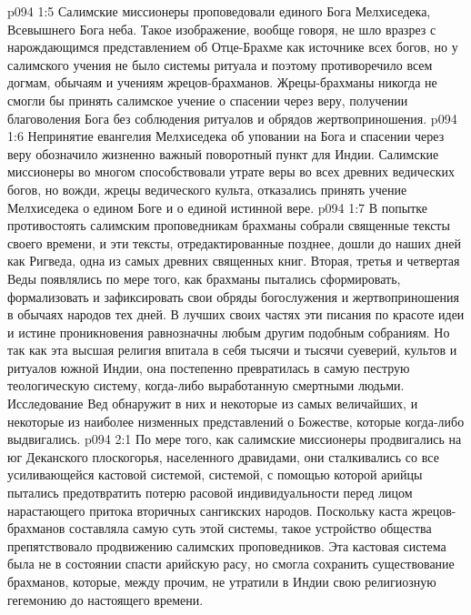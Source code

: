\vs p094 1:5 \pc Салимские миссионеры проповедовали единого Бога Мелхиседека, Всевышнего Бога неба. Такое изображение, вообще говоря, не шло вразрез с нарождающимся представлением об Отце\hyp{}Брахме как источнике всех богов, но у салимского учения не было системы ритуала и поэтому противоречило всем догмам, обычаям и учениям жрецов\hyp{}брахманов. Жрецы\hyp{}брахманы никогда не смогли бы принять салимское учение о спасении через веру, получении благоволения Бога без соблюдения ритуалов и обрядов жертвоприношения.
\vs p094 1:6 \pc Непринятие евангелия Мелхиседека об уповании на Бога и спасении через веру обозначило жизненно важный поворотный пункт для Индии. Салимские миссионеры во многом способствовали утрате веры во всех древних ведических богов, но вожди, жрецы ведического культа, отказались принять учение Мелхиседека о едином Боге и о единой истинной вере.
\vs p094 1:7 В попытке противостоять салимским проповедникам брахманы собрали священные тексты своего времени, и эти тексты, отредактированные позднее, дошли до наших дней как Ригведа, одна из самых древних священных книг. Вторая, третья и четвертая Веды появлялись по мере того, как брахманы пытались сформировать, формализовать и зафиксировать свои обряды богослужения и жертвоприношения в обычаях народов тех дней. В лучших своих частях эти писания по красоте идеи и истине проникновения равнозначны любым другим подобным собраниям. Но так как эта высшая религия впитала в себя тысячи и тысячи суеверий, культов и ритуалов южной Индии, она постепенно превратилась в самую пеструю теологическую систему, когда\hyp{}либо выработанную смертными людьми. Исследование Вед обнаружит в них и некоторые из самых величайших, и некоторые из наиболее низменных представлений о Божестве, которые когда\hyp{}либо выдвигались.
\vs p094 2:1 По мере того, как салимские миссионеры продвигались на юг Деканского плоскогорья, населенного дравидами, они сталкивались со все усиливающейся кастовой системой, системой, с помощью которой арийцы пытались предотвратить потерю расовой индивидуальности перед лицом нарастающего притока вторичных сангикских народов. Поскольку каста жрецов\hyp{}брахманов составляла самую суть этой системы, такое устройство общества препятствовало продвижению салимских проповедников. Эта кастовая система была не в состоянии спасти арийскую расу, но смогла сохранить существование брахманов, которые, между прочим, не утратили в Индии свою религиозную гегемонию до настоящего времени.
